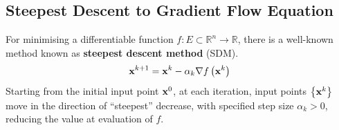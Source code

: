 \documentclass[../dissertation.tex]{subfiles}
\begin{document}
\subsection{Steepest Descent to Gradient Flow Equation}
For minimising a differentiable function $f:E \subset \mathbb{R}^n \rightarrow \mathbb{R}$, there is a well-known method known as \textbf{steepest descent method} (SDM)\cite{doi:10.1137/1.9781611974997.ch8}.
\begin{equation}
    \mathbf{x}^{k+1} = \mathbf{x}^{k} - \alpha_k \nabla f \left( \mathbf{x}^{k} \right)
    \label{equ: SDM}
\end{equation}
Starting from the initial input point $\mathbf{x}^{0}$, at each iteration, input points $\left\{ \mathbf{x}^{k} \right\}$ move in the direction of ``steepest'' decrease,
with specified step size $\alpha_k > 0$,
reducing the value at evaluation of $f$.
\end{document}
